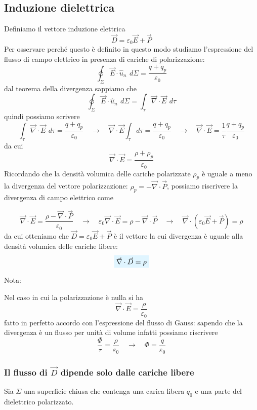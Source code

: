 \documentclass[x11names]{report}
\newcommand{\nota}[2]{
	\begin{attenzione}{Nota:}
		#2
	\end{attenzione}
}
\newcommand{\viola}[1]{%
	\colorbox{myblue}{$\displaystyle #1$}
}
\begin{document}
\subsection{Induzione dielettrica}
Definiamo il vettore induzione elettrica
\[
\vec{D} = \varepsilon_0\vec{E} + \vec{P	}
\]
Per osservare perché questo è definito in questo modo studiamo l'espressione del flusso di campo elettrico in presenza di cariche di polarizzazione:
\[
\oint_{\Sigma} \vec{E} \cdot \hat{u}_n \,\ d\Sigma = \frac{q + q_p}{\varepsilon_0}
\]
dal teorema della divergenza sappiamo che 
\[
\oint_{\Sigma}\vec{E} \cdot \hat{u}_n \,\ d\Sigma = \int_{\tau} \vec{\nabla}\cdot \vec{E} \,\ d\tau
\]
quindi possiamo scrivere
\[
\int_{\tau} \vec{\nabla}\cdot \vec{E} \,\ d\tau = \frac{q + q_p}{\varepsilon_0} \quad \to \quad \vec{\nabla}\cdot \vec{E} \int_{\tau}  d\tau = \frac{q + q_p}{\varepsilon_0} \quad \to \quad \vec{\nabla}\cdot \vec{E} = \frac{1}{\tau}  \frac{q + q_p}{\varepsilon_0}
\]
da cui
\[
\vec{\nabla}\cdot \vec{E} = \frac{\rho + \rho_p}{\varepsilon_0}
\]
Ricordando che la densità volumica delle cariche polarizzate \(\rho_p\) è uguale a meno la divergenza del vettore polarizzazione: \(\rho_p = - \vec{\nabla}\cdot \vec{P}\), possiamo riscrivere la divergenza di campo elettrico come

\[
\vec{\nabla}\cdot \vec{E} = \frac{\rho - \vec{\nabla}\cdot \vec{P}}{\varepsilon_0}  \quad \to \quad \varepsilon_0\vec{\nabla}\cdot \vec{E} = \rho - \vec{\nabla}\cdot \vec{P} \quad \to \quad \vec{\nabla} \cdot \left(\varepsilon_0\vec{E} + \vec{P}\right) = \rho
\]
da cui otteniamo che \(\vec{D} = \varepsilon_0\vec{E} + \vec{P}\) è il vettore la cui divergenza è uguale alla densità volumica delle cariche libere:
\begin{equation}
	\viola{\vec{\nabla} \cdot \vec{D}= \rho} 
\end{equation}
\nota{}{
\label{approx senza p}
Nel caso in cui la polarizzazione è nulla si ha
\[
\vec{\nabla} \cdot \vec{E} = \frac{\rho}{\varepsilon_0}
\]
fatto in perfetto accordo con l'espressione del flusso di Gauss: sapendo che la divergenza è un flusso per unità di volume infatti possiamo riscrivere 
\[
\frac{\Phi}{\tau} = \frac{\rho}{\varepsilon_0} \quad \to \quad \Phi = \frac{q}{\varepsilon_0}
\]
}

\subsubsection{Il flusso di \(\vec{D}\) dipende solo dalle cariche libere}
Sia \(\Sigma\) una superficie chiusa che contenga una carica libera \(q_0\) e una parte del dielettrico polarizzato. 
\end{document}
